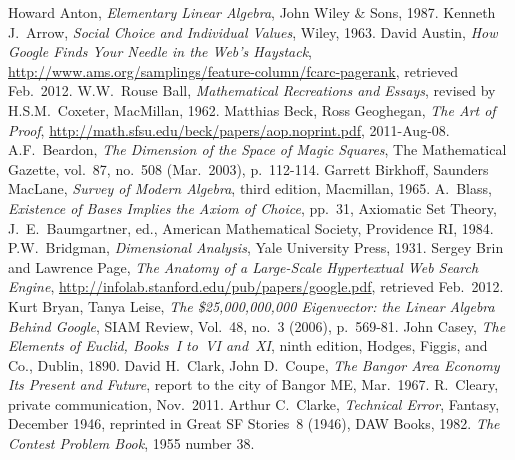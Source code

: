 \begin{thebibliography}{\makebox[2em][c]{{}\hfil{}}}
  Howard Anton,
  \emph{Elementary Linear Algebra},
  John Wiley \& Sons,
  1987.
  Kenneth J.~Arrow,
  \emph{Social Choice and Individual Values},
  Wiley,
  1963.
  David Austin,
  \emph{How Google Finds Your Needle in the Web's Haystack},
  \url{http://www.ams.org/samplings/feature-column/fcarc-pagerank},
  retrieved Feb.~2012.
 W.W.~Rouse Ball,
 \emph{Mathematical Recreations and Essays},
 revised by H.S.M.~Coxeter,
 MacMillan,
 1962.
  Matthias Beck, Ross Geoghegan,
  \emph{The Art of Proof},
  \url{http://math.sfsu.edu/beck/papers/aop.noprint.pdf},
  2011-Aug-08.
  A.F.\ Beardon,
  \emph{The Dimension of the Space of Magic Squares},
  The Mathematical Gazette,
  vol.\ 87, no.\ 508 (Mar.\ 2003), p.~112-114.
  Garrett Birkhoff, Saunders MacLane,
  \emph{Survey of Modern Algebra},
  third edition,
  Macmillan, 
  1965.
  A.~Blass,
  \emph{Existence of Bases Implies the Axiom of Choice},
  pp.\ 31,
  Axiomatic Set Theory, J.\ E.\ Baumgartner, ed.,
  American Mathematical Society,
  Providence RI, 1984.
  P.W.~Bridgman,
  \emph{Dimensional Analysis},
  Yale University Press,
  1931.
  Sergey Brin and Lawrence Page,
  \emph{The Anatomy of a Large-Scale Hypertextual
        Web Search Engine},
  \url{http://infolab.stanford.edu/pub/papers/google.pdf},
  retrieved Feb.~2012.
  Kurt Bryan, Tanya Leise,
  \emph{The \$25,000,000,000 Eigenvector: the Linear Algebra Behind Google},
  SIAM Review, 
  Vol.\ 48, no.\ 3 (2006), p.\ 569-81. 
  John Casey,
  \emph{The Elements of Euclid, Books~I to~VI and~XI},
  ninth edition,
  Hodges, Figgis, and Co.,
  Dublin,
  1890.
  David H.\ Clark, John D.\ Coupe,
  \emph{The Bangor Area Economy Its Present and Future},
  report to the city of Bangor ME,
  Mar.\ 1967.
  R.~Cleary,
  private communication,
  Nov.\ 2011.
  Arthur C.~Clarke,
  \emph{Technical Error},
  Fantasy, December 1946,
  reprinted in
  Great SF Stories~8 (1946),
  DAW Books, 1982. 
  \emph{The Contest Problem Book},
  1955 number 38.

\end{thebibliography}
